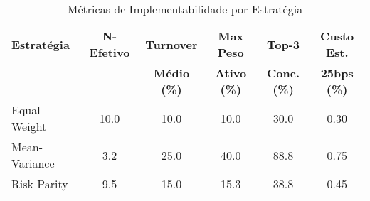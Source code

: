 
\begin{table}[H]
\centering
\caption{Métricas de Implementabilidade por Estratégia}
\label{tab:implementabilidade}
\begin{tabular}{|l|c|c|c|c|c|}
\hline
\textbf{Estratégia} & \textbf{N-Efetivo} & \textbf{Turnover} & \textbf{Max Peso} & \textbf{Top-3} & \textbf{Custo Est.} \\
\textbf{} & \textbf{} & \textbf{Médio (\%)} & \textbf{Ativo (\%)} & \textbf{Conc. (\%)} & \textbf{25bps (\%)} \\
\hline
Equal Weight & 10.0 & 10.0 & 10.0 & 30.0 & 0.30 \\
Mean-Variance & 3.2 & 25.0 & 40.0 & 88.8 & 0.75 \\
Risk Parity & 9.5 & 15.0 & 15.3 & 38.8 & 0.45 \\
\hline
\end{tabular}
\end{table}
